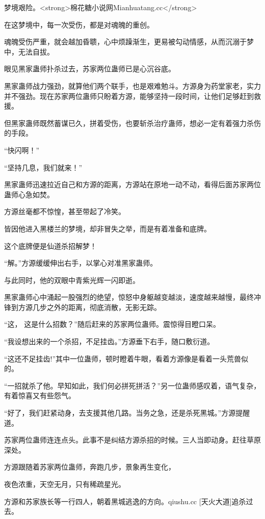 
\begin{this_body}

梦境艰险。<strong>棉花糖小说网Mianhuatang.cc</strong>

在这梦境中，每一次受伤，都是对魂魄的重创。

魂魄受伤严重，就会越加昏聩，心中烦躁渐生，更易被勾动情感，从而沉溺于梦中，无法自拔。

眼见黑家蛊师扑杀过去，苏家两位蛊师已是心沉谷底。

黑家蛊师战力强劲，就算他们两个联手，也是艰难勉斗。方源身为药堂家老，实力并不强劲。现在苏家两位蛊师只盼着方源，能够坚持一段时间，让他们足够赶到救援。

但黑家蛊师既然蓄谋已久，拼着受伤，也要斩杀治疗蛊师，想必一定有着强力杀伤的手段。

“快闪啊！”

“坚持几息，我们就来！”

黑家蛊师迅速拉近自己和方源的距离，方源站在原地一动不动，看得后面苏家两位蛊师心急如焚。

方源丝毫都不惊惶，甚至带起了冷笑。

皆因他进入黑楼兰的梦境，却非冒失之举，而是有着准备和底牌。

这个底牌便是仙道杀招解梦！

“解。”方源缓缓伸出右手，以掌心对准黑家蛊师。

与此同时，他的双眼中青紫光辉一闪即逝。

黑家蛊师心中涌起一股强烈的绝望，惊怒中身躯越变越淡，速度越来越慢，最终冲锋到方源几步之外的距离，彻底消散，无影无踪。

“这， 这是什么招数？”随后赶来的苏家两位蛊师。震惊得目瞪口呆。

“我设想出来的一个杀招，不足挂齿。”方源垂下右手，随口敷衍道。

“这还不足挂齿!”其中一位蛊师，顿时瞪着牛眼，看着方源像是看着一头荒兽似的。

“一招就杀了他。早知如此，我们何必拼死拼活？”另一位蛊师感叹着，语气复杂，有着惊喜又有些怨气。

“好了，我们赶紧动身，去支援其他几路。当务之急，还是杀死黑城。”方源提醒道。

苏家两位蛊师连连点头。此事不是纠结方源杀招的时候。三人当即动身。赶往草原深处。

方源跟随着苏家两位蛊师，奔跑几步，景象再生变化，

夜色浓重，天空无月，只有稀疏星光。

方源和苏家族长等一行四人，朝着黑城逃逸的方向。qiushu.cc [天火大道]追杀过去。


\end{this_body}
